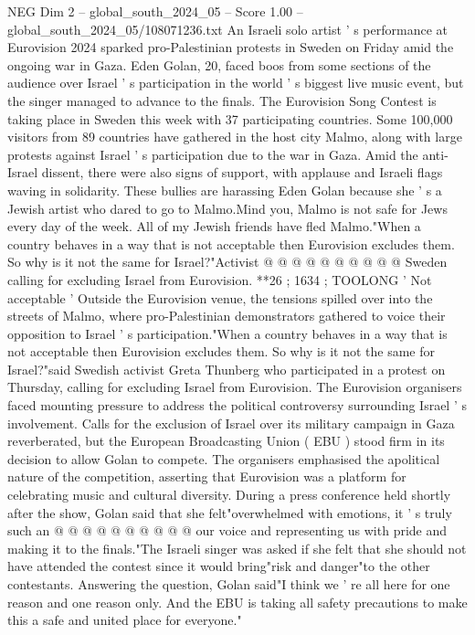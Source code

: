 \begin{textsample}{NEG Dim 2 – global\_south\_2024\_05 – Score 1.00 – global\_south\_2024\_05/108071236.txt}  \label{ex:f2_neg_217}
An Israeli solo artist ' s performance at Eurovision 2024 sparked pro-Palestinian protests in Sweden on Friday amid the ongoing war in Gaza.
Eden Golan, 20, faced boos from some sections of the audience over Israel ' s participation in the world ' s biggest live music event, but the singer managed to advance to the finals.
The Eurovision Song Contest is taking place in Sweden this week with 37 participating countries.
Some 100,000 visitors from 89 countries have gathered in the host city Malmo, along with large protests against Israel ' s participation due to the war in Gaza.
Amid the anti-Israel dissent, there were also signs of support, with applause and Israeli flags waving in solidarity.
These bullies are harassing Eden Golan because she ' s a Jewish artist who dared to go to Malmo.Mind you, Malmo is not safe for Jews every day of the week.
All of my Jewish friends have fled Malmo."When a country behaves in a way that is not acceptable then Eurovision excludes them.
So why is it not the same for Israel?"Activist @ @ @ @ @ @ @ @ @ @ Sweden calling for excluding Israel from Eurovision. **26 ; 1634 ; TOOLONG ' Not acceptable ' Outside the Eurovision venue, the tensions spilled over into the streets of Malmo, where pro-Palestinian demonstrators gathered to voice their opposition to Israel ' s participation."When a country behaves in a way that is not acceptable then Eurovision excludes them.
So why is it not the same for Israel?"said Swedish activist Greta Thunberg who participated in a protest on Thursday, calling for excluding Israel from Eurovision.
The Eurovision organisers faced mounting pressure to address the political controversy surrounding Israel ' s involvement.
Calls for the exclusion of Israel over its military campaign in Gaza reverberated, but the European Broadcasting Union ( EBU ) stood firm in its decision to allow Golan to compete.
The organisers emphasised the apolitical nature of the competition, asserting that Eurovision was a platform for celebrating music and cultural diversity.
During a press conference held shortly after the show, Golan said that she felt"overwhelmed with emotions, it ' s truly such an @ @ @ @ @ @ @ @ @ @ our voice and representing us with pride and making it to the finals."The Israeli singer was asked if she felt that she should not have attended the contest since it would bring"risk and danger"to the other contestants.
Answering the question, Golan said"I think we ' re all here for one reason and one reason only.
And the EBU is taking all safety precautions to make this a safe and united place for everyone."

\end{textsample}
